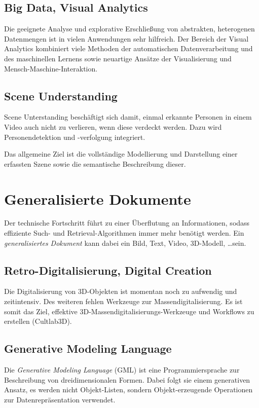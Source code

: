 		\subsection{Big Data, Visual Analytics}
			Die geeignete Analyse und explorative Erschließung von abstrakten, heterogenen Datenmengen ist in vielen Anwendungen sehr hilfreich. Der Bereich der Visual Analytics kombiniert viele Methoden der automatischen Datenverarbeitung und des maschinellen Lernens sowie neuartige Ansätze der Visualisierung und Mensch-Maschine-Interaktion.

		\subsection{Scene Understanding}
			Scene Unterstanding beschäftigt sich \zB damit, einmal erkannte Personen in einem Video auch nicht zu verlieren, wenn diese verdeckt werden. Dazu wird Personendetektion und -verfolgung integriert.

			Das allgemeine Ziel ist die vollständige Modellierung und Darstellung einer erfassten Szene sowie die semantische Beschreibung dieser.

	\section{Generalisierte Dokumente}
		Der technische Fortschritt führt zu einer Überflutung an Informationen, sodass effiziente Such- und Retrieval-Algorithmen immer mehr benötigt werden. Ein \emph{generalisiertes Dokument} kann dabei ein Bild, Text, Video, 3D-Modell, \dots sein.

		\subsection{Retro-Digitalisierung, Digital Creation}
			Die Digitalisierung von 3D-Objekten ist momentan noch zu aufwendig und zeitintensiv. Des weiteren fehlen Werkzeuge zur Massendigitalisierung. Es ist somit das Ziel, effektive 3D-Massendigitalisierungs-Werkzeuge und Workflows zu erstellen (\zB Cultlab3D).

		\subsection{Generative Modeling Language}
			Die \emph{Generative Modeling Language} (GML) ist eine Programmiersprache zur Beschreibung von dreidimensionalen Formen. Dabei folgt sie einem generativen Ansatz, \dh es werden nicht Objekt-Listen, sondern Objekt-erzeugende Operationen zur Datenrepräsentation verwendet.


